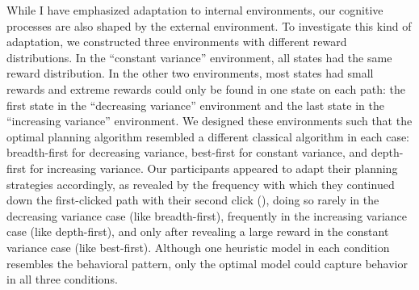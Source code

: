 \documentclass[dsingle]{memo}
\begin{document}

While I have emphasized adaptation to internal environments, our cognitive processes are also shaped by the external environment. To investigate this kind of adaptation, we constructed three environments with different reward distributions. In the ``constant variance'' environment, all states had the same reward distribution. In the other two environments, most states had small rewards and extreme rewards could only be found in one state on each path: the first state in the ``decreasing variance'' environment and the last state in the ``increasing variance'' environment. We designed these environments such that the optimal planning algorithm resembled a different classical algorithm in each case: breadth-first for decreasing variance, best-first for constant variance, and depth-first for increasing variance. Our participants appeared to adapt their planning strategies accordingly, as revealed by the frequency with which they continued down the first-clicked path with their second click (), doing so rarely in the decreasing variance case (like breadth-first), frequently in the increasing variance case (like depth-first), and only after revealing a large reward in the constant variance case (like best-first). Although one heuristic model in each condition resembles the behavioral pattern, only the optimal model could capture behavior in all three conditions. 

\end{document}
